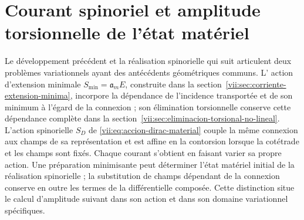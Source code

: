 
\section{Courant spinoriel et amplitude torsionnelle de l'état matériel}
\label{vii:sec:corriente-espinorial-densidad}

Le développement précédent et la réalisation spinorielle qui suit articulent
deux problèmes variationnels ayant des antécédents géométriques communs. L'
action d'extension minimale \(S_{\min}=\mathfrak a_m E\), construite dans
la section~\ref{vii:sec:corriente-extension-minima}, incorpore la
dépendance de l'incidence transportée et de son minimum à l'égard de la
connexion ; son élimination torsionnelle conserve cette dépendance complète dans
la section~\ref{vii:sec:eliminacion-torsional-no-lineal}. L'action
spinorielle \(S_D\) de \eqref{vii:eq:accion-dirac-material} couple la
même connexion aux champs de sa représentation et est affine en la
contorsion lorsque la cotétrade et les champs sont fixés. Chaque courant s'obtient
en faisant varier sa propre action. Une préparation minimisante peut déterminer
l'état matériel initial de la réalisation spinorielle ; la substitution
de champs dépendant de la connexion conserve en outre les termes
de la différentielle composée. Cette distinction situe le calcul d'amplitude
suivant dans son action et dans son domaine variationnel spécifiques.


